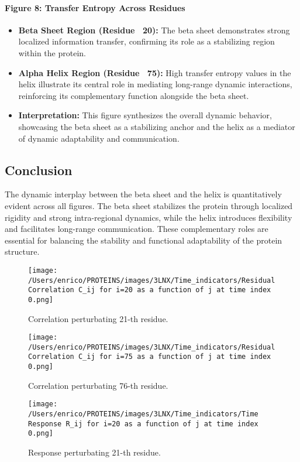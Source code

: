\documentclass[English, Lau, oneside]{sapthesis}
\begin{document}
\begin{itemize}
\paragraph{Figure 8: Transfer Entropy Across Residues}
\begin{itemize}
    \item \textbf{Beta Sheet Region (Residue ~20):} The beta sheet demonstrates strong localized information transfer, confirming its role as a stabilizing region within the protein.
    \item \textbf{Alpha Helix Region (Residue ~75):} High transfer entropy values in the helix illustrate its central role in mediating long-range dynamic interactions, reinforcing its complementary function alongside the beta sheet.
    \item \textbf{Interpretation:} This figure synthesizes the overall dynamic behavior, showcasing the beta sheet as a stabilizing anchor and the helix as a mediator of dynamic adaptability and communication.
\end{itemize}

\subsection*{Conclusion}
The dynamic interplay between the beta sheet and the helix is quantitatively evident across all figures. The beta sheet stabilizes the protein through localized rigidity and strong intra-regional dynamics, while the helix introduces flexibility and facilitates long-range communication. These complementary roles are essential for balancing the stability and functional adaptability of the protein structure.

\begin{figure}[h!]
    \centering
    \texttt{[image: /Users/enrico/PROTEINS/images/3LNX/Time\_indicators/Residual Correlation C\_ij for i=20 as a function of j at time index 0.png]}
        \caption{Correlation perturbating 21-th residue.}
\end{figure}

\begin{figure}[h!]
    \centering
    \texttt{[image: /Users/enrico/PROTEINS/images/3LNX/Time\_indicators/Residual Correlation C\_ij for i=75 as a function of j at time index 0.png]}
    \caption{Correlation perturbating 76-th residue.}
\end{figure}
\begin{figure}[h!]
    \centering
    \texttt{[image: /Users/enrico/PROTEINS/images/3LNX/Time\_indicators/Time Response R\_ij for i=20 as a function of j at time index 0.png]}
    \caption{Response perturbating 21-th residue.}
\end{figure}


\end{itemize}
\end{document}

